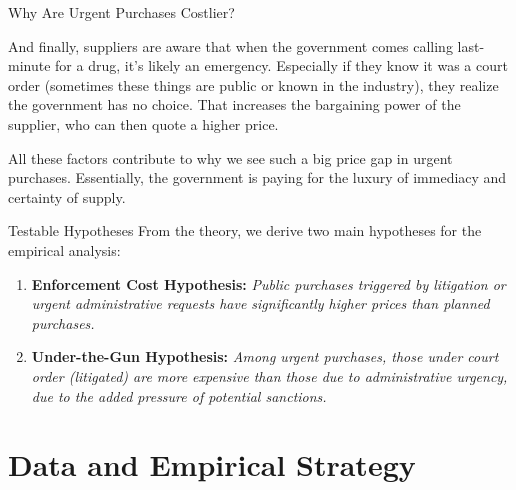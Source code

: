 \documentclass[aspectratio=169]{beamer}
\begin{document}
\begin{frame}{Why Are Urgent Purchases Costlier?}
{And finally, suppliers are aware that when the government comes calling last-minute for a drug, it's likely an emergency. Especially if they know it was a court order (sometimes these things are public or known in the industry), they realize the government has no choice. That increases the bargaining power of the supplier, who can then quote a higher price. 

All these factors contribute to why we see such a big price gap in urgent purchases. Essentially, the government is paying for the luxury of immediacy and certainty of supply.}
\end{frame}


\begin{frame}{Testable Hypotheses}
  From the theory, we derive two main hypotheses for the empirical analysis:
  \begin{enumerate}
    \item \textbf{Enforcement Cost Hypothesis:} \emph{Public purchases triggered by litigation or urgent administrative requests have significantly higher prices than planned purchases.}
    \item \textbf{Under-the-Gun Hypothesis:} \emph{Among urgent purchases, those under court order (litigated) are more expensive than those due to administrative urgency, due to the added pressure of potential sanctions.}
  \end{enumerate}
\end{frame}

\section{Data and Empirical Strategy}
\end{document}
